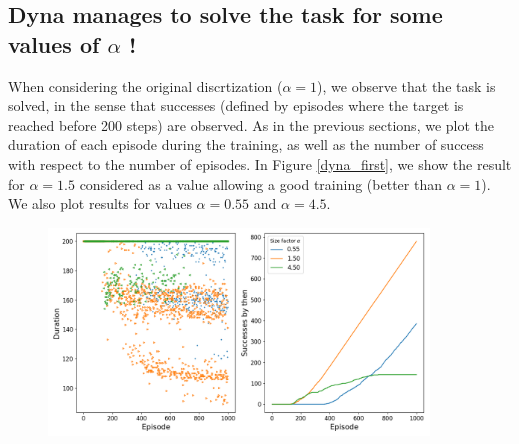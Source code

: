 \documentclass[a4paper, 12pt,oneside]{article}
\begin{document}
        \subsection{Dyna manages to solve the task for some values of $\alpha$ !}
        When considering the original discrtization ($\alpha=1$), we observe that the task is solved, in the sense that successes (defined by episodes where the target is reached before 200 steps) are observed. 
        As in the previous sections, we plot the duration of each episode during the training, as well as the number of success with respect to the number of episodes. 
        In Figure \ref{dyna_first}, we show the result for $\alpha=1.5$ considered as a value allowing a good training (better than $\alpha=1$). We also plot results for values $\alpha=0.55$ and $\alpha=4.5$. 
        
        \begin{figure}[h]
            \centering
            \includegraphics[width=0.9\textwidth]{../runs/dyna/dyna_comparison.png}
            \caption{}
            \label{dyna-first}
        \end{figure}
        
\end{document}
